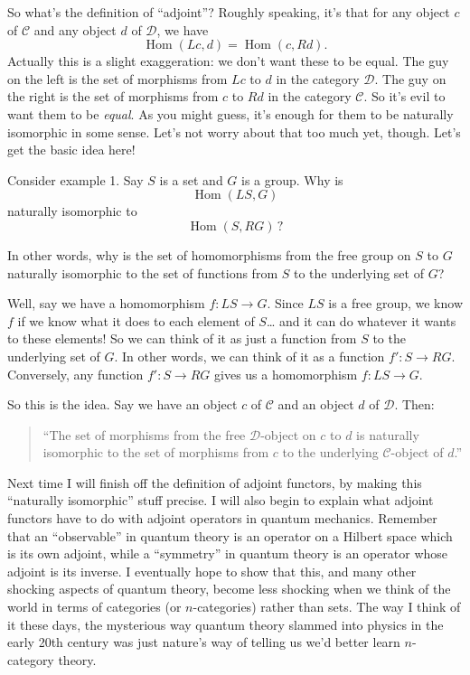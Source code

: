 \documentclass{article}
\begin{document}
So what's the definition of ``adjoint''? Roughly speaking, it's that for
any object \(c\) of \(\mathcal{C}\) and any object \(d\) of
\(\mathcal{D}\), we have
\[\operatorname{Hom}(Lc,d) = \operatorname{Hom}(c,Rd).\] Actually this
is a slight exaggeration: we don't want these to be equal. The guy on
the left is the set of morphisms from \(Lc\) to \(d\) in the category
\(\mathcal{D}\). The guy on the right is the set of morphisms from \(c\)
to \(Rd\) in the category \(\mathcal{C}\). So it's evil to want them to
be \emph{equal}. As you might guess, it's enough for them to be
naturally isomorphic in some sense. Let's not worry about that too much
yet, though. Let's get the basic idea here!

Consider example 1. Say \(S\) is a set and \(G\) is a group. Why is
\[\operatorname{Hom}(LS,G)\] naturally isomorphic to
\[\operatorname{Hom}(S,RG) \,\text{?}\]

In other words, why is the set of homomorphisms from the free group on
\(S\) to \(G\) naturally isomorphic to the set of functions from \(S\)
to the underlying set of \(G\)?

Well, say we have a homomorphism \(f\colon LS \to G\). Since \(LS\) is a
free group, we know \(f\) if we know what it does to each element of
\(S\)\ldots{} and it can do whatever it wants to these elements! So we
can think of it as just a function from \(S\) to the underlying set of
\(G\). In other words, we can think of it as a function
\(f'\colon S \to RG\). Conversely, any function \(f'\colon S \to RG\)
gives us a homomorphism \(f\colon LS \to G\).

So this is the idea. Say we have an object \(c\) of \(\mathcal{C}\) and
an object \(d\) of \(\mathcal{D}\). Then:

\begin{quote}
``The set of morphisms from the free \(\mathcal{D}\)-object on \(c\) to
\(d\) is naturally isomorphic to the set of morphisms from \(c\) to the
underlying \(\mathcal{C}\)-object of \(d\).''
\end{quote}

Next time I will finish off the definition of adjoint functors, by
making this ``naturally isomorphic'' stuff precise. I will also begin to
explain what adjoint functors have to do with adjoint operators in
quantum mechanics. Remember that an ``observable'' in quantum theory is
an operator on a Hilbert space which is its own adjoint, while a
``symmetry'' in quantum theory is an operator whose adjoint is its
inverse. I eventually hope to show that this, and many other shocking
aspects of quantum theory, become less shocking when we think of the
world in terms of categories (or \(n\)-categories) rather than sets. The
way I think of it these days, the mysterious way quantum theory slammed
into physics in the early 20th century was just nature's way of telling
us we'd better learn \(n\)-category theory.
\end{document}
